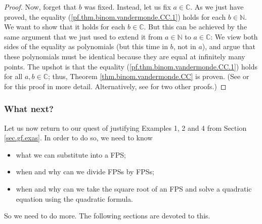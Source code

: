 \begin{proof}
Now, forget that $b$ was fixed. Instead, let us fix $a\in\mathbb{C}$. As we
just have proved, the equality (\ref{pf.thm.binom.vandermonde.CC.1}) holds for
each $b\in\mathbb{N}$. We want to show that it holds for each $b\in\mathbb{C}%
$. But this can be achieved by the same argument that we just used to extend
it from $a\in\mathbb{N}$ to $a\in\mathbb{C}$: We view both sides of the
equality as polynomials (but this time in $b$, not in $a$), and argue that
these polynomials must be identical because they are equal at infinitely many
points. The upshot is that the equality (\ref{pf.thm.binom.vandermonde.CC.1})
holds for all $a,b\in\mathbb{C}$; thus, Theorem \ref{thm.binom.vandermonde.CC}
is proven. (See \cite[proofs of Lemma 7.5.8 and Theorem 7.5.3]{20f} or
\cite[\S 2.17.3]{19s} for this proof in more detail. Alternatively, see
\cite[\S 3.3.2 and \S 3.3.3]{detnotes} for two other proofs.)
\end{proof}

\subsubsection{What next?}

Let us now return to our quest of justifying Examples 1, 2 and 4 from Section
\ref{sec.gf.exas}. In order to do so, we need to know

\begin{itemize}
\item what we can substitute into a FPS;

\item when and why can we divide FPSs by FPSs;

\item when and why can we take the square root of an FPS and solve a quadratic
equation using the quadratic formula.
\end{itemize}

So we need to do more. The following sections are devoted to this.
